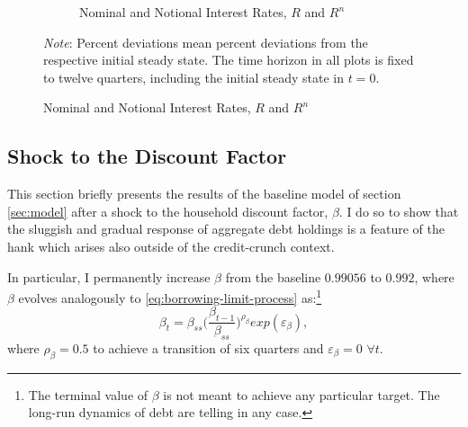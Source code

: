 \documentclass[a4paper,12pt]{article} %
\numberwithin{equation}{section} %
\numberwithin{figure}{section}
\numberwithin{table}{section}
\begin{document}
\begin{refsection}
\begin{appendices}
\begin{figure}[H]
\begin{subfigure}[b]{0.49\textwidth}
         \centering
         
     \end{subfigure}
     \hfill
     \begin{subfigure}[b]{0.49\textwidth}
     \caption{Nominal and Notional Interest Rates, $R$ and $R^n$}
     \label{fig:comparison-low-B-agg-Rn}
         \centering
         
     \end{subfigure}
     
     \vspace{10pt}
     
     \justifying
     \footnotesize
	\textit{Note}: Percent deviations mean percent deviations from the respective initial steady state. The time horizon in all plots is fixed to twelve quarters, including the initial steady state in $t=0$.
\end{figure}

\subsection{Shock to the Discount Factor}
\label{sec-app:robust-beta}

This section briefly presents the results of the baseline model of section \ref{sec:model} after a shock to the household discount factor, $\beta$. I do so to show that the sluggish and gradual response of aggregate debt holdings is a feature of the \Gls{hank} which arises also outside of the credit-crunch context.

In particular, I permanently increase $\beta$ from the baseline $0.99056$ to $0.992$, where $\beta$ evolves analogously to \eqref{eq:borrowing-limit-process} as:\footnote{The terminal value of $\beta$ is not meant to achieve any particular target. The long-run dynamics of debt are telling in any case.}
\begin{equation*}
    \beta_t = \beta_{ss} \Bigg( \frac{\beta_{t-1}}{\beta_{ss}} \Bigg)^{\rho_{\beta}} exp(\varepsilon_{\beta}),
\end{equation*}
where $\rho_{\beta} = 0.5$ to achieve a transition of six quarters and $\varepsilon_{\beta} = 0$ $\forall t$.


\end{appendices}
\end{refsection}
\end{document}
